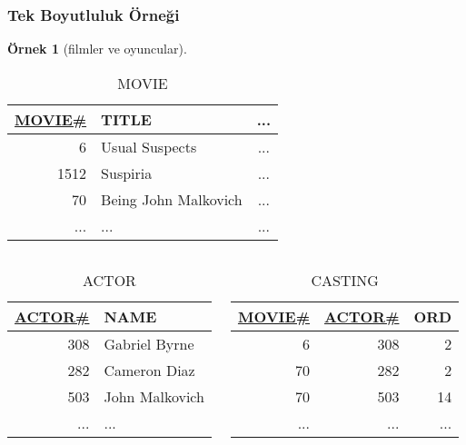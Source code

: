 \documentclass[dvipsnames]{beamer}
\theoremstyle{definition}
\theoremstyle{example}
\newtheorem{ornek}[theorem]{Örnek}
\theoremstyle{plain}
\begin{document}
\begin{frame}
  \frametitle{Tek Boyutluluk Örneği}

  \begin{ornek}[filmler ve oyuncular]
    \begin{tiny}
    \begin{table}
      \caption{MOVIE}
      \begin{tabular}{|r|l|c|}\hline
\underline{MOVIE\#} & TITLE                & ...\\[2pt]\hline\hline
                  6 & Usual Suspects       & ...\\\hline
               1512 & Suspiria             & ...\\\hline
                 70 & Being John Malkovich & ...\\\hline
                ... & ...                  & ...\\\hline
      \end{tabular}
    \end{table}
    \end{tiny}

    \vspace{-12pt}
    \begin{columns}[t]
      \begin{tiny}
      \begin{table}
        \caption{ACTOR}
        \begin{tabular}{|r|l|}\hline
\underline{ACTOR\#} & NAME          \\[2pt]\hline\hline
                308 & Gabriel Byrne \\\hline
                282 & Cameron Diaz  \\\hline
                503 & John Malkovich\\\hline
                ... & ...           \\\hline
        \end{tabular}
      \end{table}
      \end{tiny}

      \begin{tiny}
      \begin{table}
        \caption{CASTING}
        \begin{tabular}{|r|r|r|}\hline
\underline{MOVIE\#} & \underline{ACTOR\#} & ORD\\[2pt]\hline\hline
                  6 &                 308 &   2\\\hline
                 70 &                 282 &   2\\\hline
                 70 &                 503 &  14\\\hline
                ... &                 ... & ...\\\hline
        \end{tabular}
      \end{table}
      \end{tiny}
    \end{columns}
  \end{ornek}
\end{frame}
\end{document}
